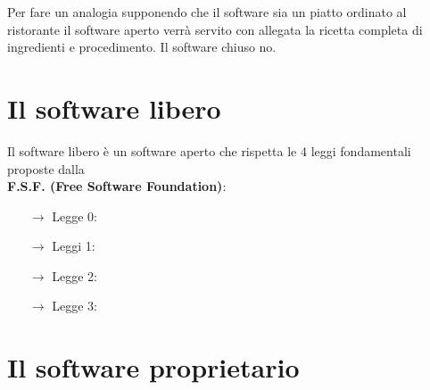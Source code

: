 \documentclass[]{article}
\begin{document}
Per fare un analogia supponendo che il software sia un piatto ordinato al ristorante il software  aperto verrà servito con allegata la ricetta completa di ingredienti e procedimento. Il software chiuso no.

\section{Il software libero}
Il software libero è un software  aperto che rispetta le 4 leggi fondamentali proposte dalla\\
 \textbf{F.S.F. (Free Software Foundation)}:
\begin{itemize}
	\item[$ \rightarrow $] Legge 0:
	\item[$ \rightarrow $] Leggi 1:
	\item[$ \rightarrow $] Legge 2:
	\item[$ \rightarrow $] Legge 3:
\end{itemize}

\section{Il software proprietario}
\end{document}
